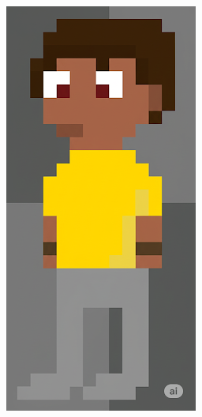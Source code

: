 \begin{figure}[htbp]
\begin{subfigure}{0.23\linewidth}
        \label{fig:geminiPro15a}
    \end{subfigure}
    \begin{subfigure}{0.23\linewidth}
        \includegraphics[width=1\linewidth]{figs/geminiPro/chat11/1res2.PNG}

\end{subfigure}
\end{figure}
